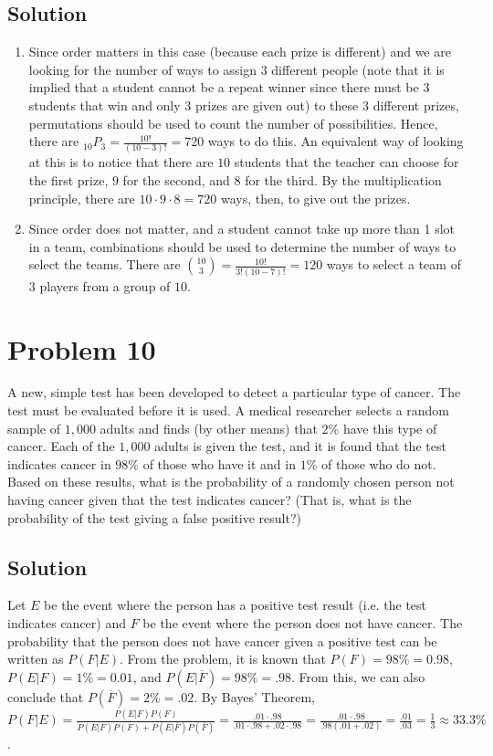 \documentclass[table]{article}
\begin{document}
\subsection{Solution}
\begin{enumerate}[nosep,label=\alph*)]
\item Since order matters in this case (because each prize is different) and we are looking for the number of ways to assign $3$ different people (note that it is implied that a student cannot be a repeat winner since there must be $3$ students that win and only $3$ prizes are given out) to these $3$ different prizes, permutations should be used to count the number of possibilities. Hence, there are $_{10}P_3 = \frac{10!}{(10-3)!}=720$ ways to do this. An equivalent way of looking at this is to notice that there are $10$ students that the teacher can choose for the first prize, $9$ for the second, and $8$ for the third. By the multiplication principle, there are $10 \cdot 9 \cdot 8 = 720$ ways, then, to give out the prizes.
\item Since order does not matter, and a student cannot take up more than 1 slot in a team, combinations should be used to determine the number of ways to select the teams. There are ${10 \choose 3} = \frac{10!}{3!(10-7)!} = 120$ ways to select a team of $3$ players from a group of $10$.
\end{enumerate}
\section{Problem 10}
A new, simple test has been developed to detect a particular type of cancer. The test must be evaluated before it is used. A medical researcher selects a random sample of $1,000$ adults and finds (by other means) that $2\%$ have this type of cancer. Each of the $1,000$ adults is given the test, and it is found that the test indicates cancer in $98\%$ of those who have it and in $1\%$ of those who do not. Based on these results, what is the probability of a randomly chosen person not having cancer given that the test indicates cancer? (That is, what is the probability of the test giving a false positive result?)
\subsection{Solution}
Let $E$ be the event where the person has a positive test result (i.e. the test indicates cancer) and $F$ be the event where the person does not have cancer. The probability that the person does not have cancer given a positive test can be written as $P(F|E)$. From the problem, it is known that $P(F)=98\%=0.98$, $P(E|F)=1\%=0.01$, and $P(E|\overline{F})=98\%=.98$. From this, we can also conclude that $P(\overline{F})=2\%=.02$. By Bayes' Theorem, $P(F|E) = \frac{P(E|F)P(F)}{P(E|F)P(F)+P(E|\overline{F})P(\overline{F})}=\frac{.01 \cdot .98}{.01 \cdot .98 + .02 \cdot .98}=\frac{.01 \cdot .98}{.98(.01 + .02)}=\frac{.01}{.03}=\frac{1}{3} \approx 33.3\%$.
\end{document}
